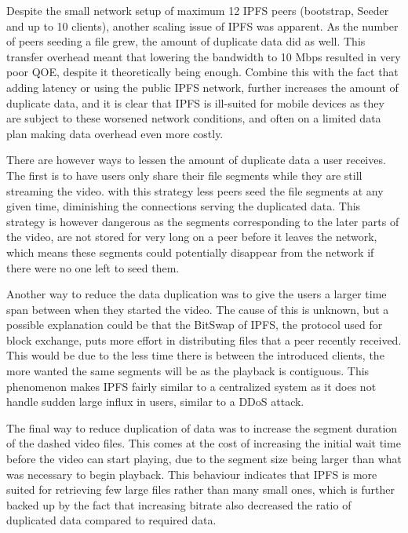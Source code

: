 Despite the small network setup of maximum 12 \ac{IPFS} peers (bootstrap, Seeder and up to 10 clients), another scaling issue of \ac{IPFS} was apparent. As the number of peers seeding a file grew, the amount of duplicate data did as well. This transfer overhead meant that lowering the bandwidth to 10 \ac{Mbps} resulted in very poor \ac{QOE}, despite it theoretically being enough. Combine this with the fact that adding latency or using the public \ac{IPFS} network, further increases the amount of duplicate data, and it is clear that \ac{IPFS} is ill-suited for mobile devices as they are subject to these worsened network conditions, and often on a limited data plan making data overhead even more costly. 

There are however ways to lessen the amount of duplicate data a user receives.
The first is to have users only share their file segments while they are still streaming the video.
with this strategy less peers seed the file segments at any given time, diminishing the connections serving the duplicated data. This strategy is however dangerous as the segments corresponding to the later parts of the video, are not stored for very long on a peer before it leaves the network, which means these segments could potentially disappear from the network if there were no one left to seed them. 

Another way to reduce the data duplication was to give the users a larger time span between when they started the video. The cause of this is unknown, but a possible explanation could be that the BitSwap of \ac{IPFS}, the protocol used for block exchange, puts more effort in distributing files that a peer recently received. This would be due to the less time there is between the introduced clients, the more wanted the same segments will be as the playback is contiguous.
This phenomenon makes \ac{IPFS} fairly similar to a centralized system as it does not handle sudden large influx in users, similar to a \ac{DDoS} attack.

The final way to reduce duplication of data was to increase the segment duration of the dashed video files. This comes at the cost of increasing the initial wait time before the video can start playing, due to the segment size being larger than what was necessary to begin playback. This behaviour indicates that \ac{IPFS} is more suited for retrieving few large files rather than many small ones, which is further backed up by the fact that increasing bitrate also decreased the ratio of duplicated data compared to required data.

